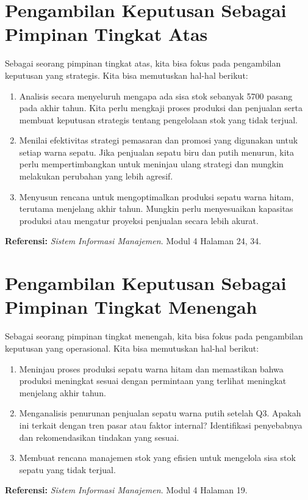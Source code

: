 \documentclass[letterpaper,11pt]{article}
\begin{document}
\section{Pengambilan Keputusan Sebagai Pimpinan Tingkat Atas}
Sebagai seorang pimpinan tingkat atas, kita bisa fokus pada pengambilan keputusan yang strategis. Kita bisa memutuskan hal-hal berikut:
  \begin{enumerate}
    \item Analisis secara menyeluruh mengapa ada sisa stok sebanyak 5700 pasang pada akhir tahun. Kita perlu mengkaji proses produksi dan penjualan serta membuat keputusan strategis tentang pengelolaan stok yang tidak terjual.
    \item Menilai efektivitas strategi pemasaran dan promosi yang digunakan untuk setiap warna sepatu. Jika penjualan sepatu biru dan putih menurun, kita perlu mempertimbangkan untuk meninjau ulang strategi dan mungkin melakukan perubahan yang lebih agresif.
    \item Menyusun rencana untuk mengoptimalkan produksi sepatu warna hitam, terutama menjelang akhir tahun. Mungkin perlu menyesuaikan kapasitas produksi atau mengatur proyeksi penjualan secara lebih akurat. 
  \end{enumerate}
  \textbf{Referensi:}
  \textit{Sistem Informasi Manajemen}. Modul 4 Halaman 24, 34.

\section{Pengambilan Keputusan Sebagai Pimpinan Tingkat Menengah}
Sebagai seorang pimpinan tingkat menengah, kita bisa fokus pada pengambilan keputusan yang operasional. Kita bisa memutuskan hal-hal berikut:
  \begin{enumerate}
    \item Meninjau proses produksi sepatu warna hitam dan memastikan bahwa produksi meningkat sesuai dengan permintaan yang terlihat meningkat menjelang akhir tahun.
    \item Menganalisis penurunan penjualan sepatu warna putih setelah Q3. Apakah ini terkait dengan tren pasar atau faktor internal? Identifikasi penyebabnya dan rekomendasikan tindakan yang sesuai.
    \item Membuat rencana manajemen stok yang efisien untuk mengelola sisa stok sepatu yang tidak terjual.
  \end{enumerate}
  \textbf{Referensi:}
  \textit{Sistem Informasi Manajemen}. Modul 4 Halaman 19.
  
\end{document}
